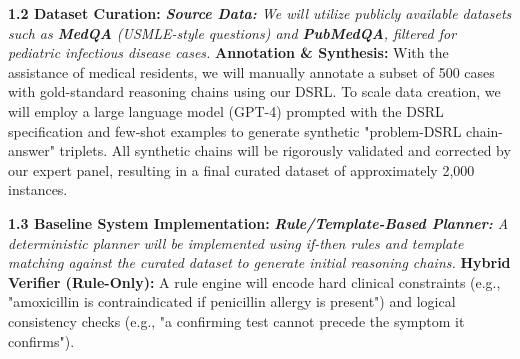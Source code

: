 \documentclass[11pt,a4paper]{article}
\begin{document}
\textbf{1.2 Dataset Curation:}
\textit{   \textbf{Source Data:} We will utilize publicly available datasets such as \textbf{MedQA} (USMLE-style questions) and \textbf{PubMedQA}, filtered for pediatric infectious disease cases.
}   \textbf{Annotation & Synthesis:} With the assistance of medical residents, we will manually annotate a subset of 500 cases with gold-standard reasoning chains using our DSRL. To scale data creation, we will employ a large language model (GPT-4) prompted with the DSRL specification and few-shot examples to generate synthetic "problem-DSRL chain-answer" triplets. All synthetic chains will be rigorously validated and corrected by our expert panel, resulting in a final curated dataset of approximately 2,000 instances.

\textbf{1.3 Baseline System Implementation:}
\textit{   \textbf{Rule/Template-Based Planner:} A deterministic planner will be implemented using if-then rules and template matching against the curated dataset to generate initial reasoning chains.
}   \textbf{Hybrid Verifier (Rule-Only):} A rule engine will encode hard clinical constraints (e.g., "amoxicillin is contraindicated if penicillin allergy is present") and logical consistency checks (e.g., "a confirming test cannot precede the symptom it confirms").
\end{document}
